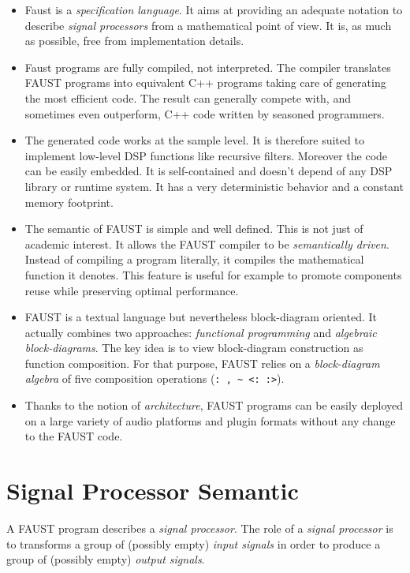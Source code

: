 \documentclass[a4paper]{book}
\begin{document}
\begin{itemize}

\item Faust is a \textit{specification language}. It aims at providing an adequate notation to describe \textit{signal processors} from a mathematical point of view. It is, as much as possible, free from implementation details. 

\item Faust programs are fully compiled, not interpreted. The compiler translates FAUST programs into equivalent C++ programs taking care of generating the most efficient code. The result can generally compete with, and sometimes even outperform, C++ code written by seasoned programmers. 

\item The generated code works at the sample level. It is therefore suited to implement low-level DSP functions like recursive filters. Moreover the code can be easily embedded. It is self-contained and doesn't depend of any DSP library or runtime system. It has a very deterministic behavior and a constant memory footprint. 

\item The semantic of FAUST is simple and well defined. This is not just of academic interest. It allows the FAUST compiler to be \emph{semantically driven}. Instead of compiling a program literally, it compiles the mathematical function it denotes. This feature is useful for example to promote components reuse while preserving optimal performance.  

\item FAUST is a textual language but nevertheless block-diagram oriented. It actually combines two approaches: \textit{functional programming} and \textit{algebraic block-diagrams}. The key idea is to view block-diagram construction as function composition. For that purpose, FAUST relies on a \emph{block-diagram algebra} of five composition operations (\lstinline': , ~ <: :>').

\item Thanks to the notion of \textit{architecture}, FAUST programs can be easily deployed on a large variety of audio platforms and plugin formats without any change to the FAUST code.

\end{itemize}

\section{Signal Processor Semantic}
A FAUST program describes a \emph{signal processor}. The role of a \textit{signal processor} is to transforms a group  of (possibly empty) \emph{input signals} in order to produce a group of (possibly empty) \emph{output signals}. 
\end{document}
